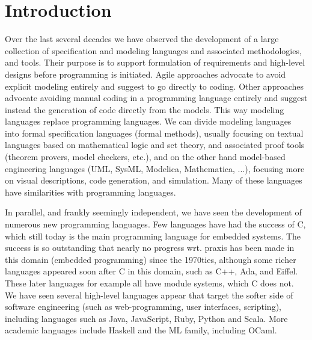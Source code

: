 
\section{Introduction}
\label{sec:introduction}

Over the last several decades we have observed the development of a 
large collection of specification and modeling languages and 
associated methodologies, and tools. Their purpose is to 
support formulation of requirements and high-level designs before 
programming is initiated. Agile approaches advocate to avoid 
explicit modeling entirely and suggest to go directly to coding. 
Other approaches advocate avoiding manual coding in a 
programming 
language entirely and suggest instead the generation of code 
directly from the models. This way modeling languages replace 
programming languages.  We can divide modeling languages into 
formal specification languages (formal methods), usually focusing 
on textual languages based on mathematical logic and set theory, 
and associated proof tools (theorem provers, model checkers, etc.), 
and on the other hand model-based engineering languages (UML, 
SysML, Modelica, Mathematica, ...), focusing more on visual 
descriptions, code generation, and simulation. Many of these 
languages have similarities with programming languages.

In parallel, and frankly seemingly independent, we have seen the 
development of numerous new programming languages. Few languages 
have had the success of C, which still today is the main 
programming language for embedded systems. The success is so 
outstanding that nearly no progress wrt. praxis has been made in 
this domain (embedded programming) since the 1970ties, although 
some richer languages appeared soon after C in this domain, such as 
C++, Ada, and Eiffel. These later languages for example
all have module systems, which C does not. We have seen several high-level languages appear that target the softer side of software 
engineering (such as web-programming, user interfaces, scripting), 
including languages such as Java, JavaScript, Ruby, Python and 
Scala.  More academic languages include Haskell and the ML family, 
including OCaml.

